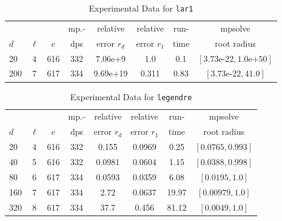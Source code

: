 \documentclass[runningheads]{llncs}
\begin{document}
\begin{table}
\caption{Experimental Data for \texttt{lar1}} %
\label{tab:lar1}
\vskip -0.15in
\begin{center}
\begin{small}
\begin{sc}
\begin{tabular}{lccccccc}
\toprule
&  &  & mp.-& relative  & relative & run- & mpsolve \\
$d$& $\ell$& $e$ & dps&error $r_d$       & error $r_1$ &time& root radius\\
\midrule
 20 & 4 & 616 & 332 & 7.06e+9 & 1.0 & 0.1 & $[3.73\text{e-}22, 1.0\text{e+}50]$\\
 200 & 7 & 617 & 334 & 9.69e+19 & 0.311 & 0.83 & $[3.73\text{e-}22, 41.0]$\\
\bottomrule
\end{tabular}
\end{sc}
\end{small}
\end{center}
\vskip 0.05in
\end{table}

\begin{table}
\caption{Experimental Data for \texttt{legendre}} %
\label{tab:legendre}
\vskip -0.15in
\begin{center}
\begin{small}
\begin{sc}
\begin{tabular}{lccccccc}
\toprule
&  &  & mp.-& relative  & relative & run- & mpsolve \\
$d$& $\ell$& $e$ & dps&error $r_d$       & error $r_1$ &time& root radius\\
\midrule
 20 & 4 & 616 & 332 & 0.155 & 0.0969 & 0.25 & $[0.0765, 0.993]$\\
 40 & 5 & 616 & 332 & 0.0981 & 0.0604 & 1.15 & $[0.0388, 0.998]$\\
 80 & 6 & 617 & 334 & 0.0593 & 0.0359 & 6.08 & $[0.0195, 1.0]$\\
  160 & 7 & 617 & 334 & 2.72 & 0.0637 & 19.97 & $[0.00979, 1.0]$\\
 320 & 8 & 617 & 334 & 37.7 & 0.456 & 81.12 & $[0.0049, 1.0]$\\
\bottomrule
\end{tabular}
\end{sc}
\end{small}
\end{center}
\vskip 0.05in
\end{table}
\end{document}
